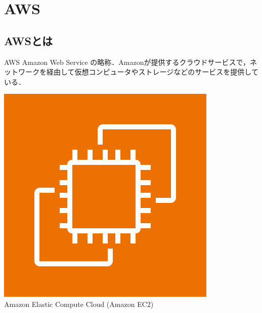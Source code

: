 \section{AWS}
\tocc
\subsection{AWSとは}
\begin{frame}[t]{\ftitle}
    \begin{block}{AWS}
        Amazon Web Service の略称．Amazonが提供するクラウドサービスで，ネットワークを経由して仮想コンピュータやストレージなどのサービスを提供している．\hfill\cite{2015amazon}
    \end{block}
    \begin{minipage}{\textwidth}
        \centering
        \begin{minipage}[t]{.32\textwidth}
            \centering
            \includegraphics[keepaspectratio,width=\textwidth]{Arch_Amazon-EC2_64@5x.png}\\
            {\tiny Amazon Elastic Compute Cloud (Amazon EC2)\cite{aws}}
        \end{minipage}
        \begin{minipage}[t]{.32\textwidth}
            \centering

\end{minipage}
\end{minipage}
\end{frame}
